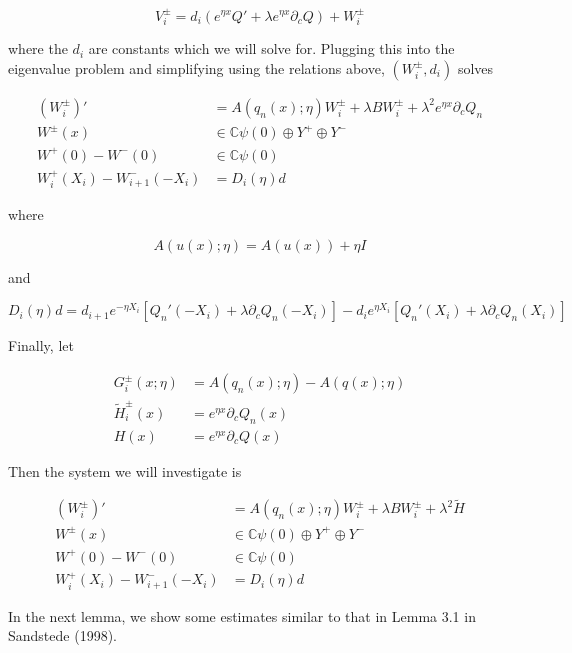 \documentclass[12pt]{article}
\def\C{{\mathbb C}}
\begin{document}
\[
V_i^\pm = d_i (e^{\eta x} Q' + \lambda e^{\eta x} \partial_c Q) + W_i^\pm
\]

where the $d_i$ are constants which we will solve for. Plugging this into the eigenvalue problem and simplifying using the relations above, $(W_i^\pm, d_i)$ solves

\begin{align*}
(W_i^\pm)' &= A(q_n(x); \eta) W_i^\pm + \lambda B W_i^\pm + \lambda^2 e^{\eta x} \partial_c Q_n \\
W^\pm(x) &\in \C \psi(0) \oplus Y^+ \oplus Y^- \\
W^+(0) - W^-(0) &\in \C \psi(0) \\
W_i^+(X_i) - W_{i+1}^-(-X_i) &= D_i(\eta) d
\end{align*}

where

\begin{equation}\label{Aeta}
A(u(x); \eta) = A(u(x)) + \eta I
\end{equation}

and

\begin{equation}\label{Did}
D_i(\eta) d = d_{i+1} e^{-\eta X_i}[ Q_n'(-X_i) + \lambda \partial_c Q_n(-X_i)] 
- d_i e^{\eta X_i}[ Q_n'(X_i) + \lambda \partial_c Q_n(X_i)] 
\end{equation}

Finally, let 

\begin{align*}
G_i^\pm(x; \eta) &= A(q_n(x); \eta) - A(q(x); \eta) \\
\tilde{H}_i^\pm(x) &= e^{\eta x} \partial_c Q_n(x) \\
H(x) &= e^{\eta x} \partial_c Q(x)
\end{align*}

Then the system we will investigate is

\begin{align*}
(W_i^\pm)' &= A(q_n(x); \eta) W_i^\pm + \lambda B W_i^\pm + \lambda^2 \tilde{H} \\
W^\pm(x) &\in \C \psi(0) \oplus Y^+ \oplus Y^- \\
W^+(0) - W^-(0) &\in \C \psi(0) \\
W_i^+(X_i) - W_{i+1}^-(-X_i) &= D_i(\eta) d
\end{align*}

In the next lemma, we show some estimates similar to that in Lemma 3.1 in Sandstede (1998).

\end{document}
